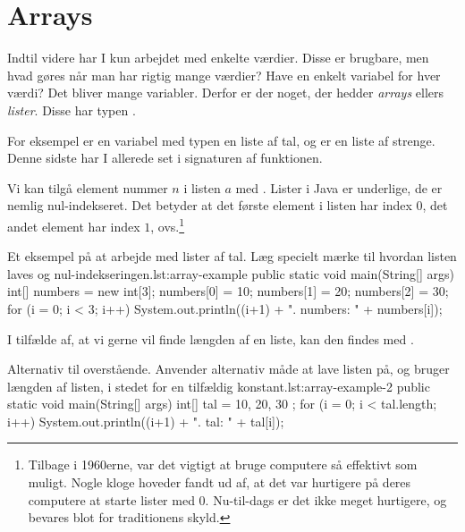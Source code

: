 \section{Arrays}

    Indtil videre har I kun arbejdet med enkelte værdier. Disse er
    brugbare, men hvad gøres når man har rigtig mange værdier? Have
    en enkelt variabel for hver værdi? Det bliver mange variabler.
    Derfor er der noget, der hedder \emph{arrays} ellers \emph{lister}.
    Disse har typen .

    For eksempel er en variabel med typen  en liste
    af tal, og  er en liste af strenge. Denne
    sidste har I allerede set i signaturen af 
    funktionen.

    Vi kan tilgå element nummer \(n\) i listen \(a\) med
    .  Lister i Java er underlige, de er nemlig
    nul-indekseret. Det betyder at det første element i listen har
    index \(0\), det andet element har index \(1\),
    ovs.\footnote{Tilbage i 1960erne, var det vigtigt at bruge
    computere så effektivt som muligt. Nogle kloge hoveder
    fandt ud af, at det var hurtigere på deres computere at starte
    lister med 0. Nu-til-dags er det ikke meget hurtigere, og
    bevares blot for traditionens skyld.}

    \begin{JavaCode}{Et eksempel på at arbejde med lister af tal. Læg specielt mærke til hvordan listen laves og nul-indekseringen.}{lst:array-example}
        public static void main(String[] args) {
            int[] numbers = new int[3];
            numbers[0] = 10;
            numbers[1] = 20;
            numbers[2] = 30;
            for (i = 0; i < 3; i++) {
                System.out.println((i+1) + ". numbers: "
                                         + numbers[i]);
            }
        }
    \end{JavaCode}

    I tilfælde af, at vi gerne vil finde længden af en liste, kan den findes med
    .

    \begin{JavaCode}{Alternativ til overstående. Anvender alternativ måde at lave listen på, og bruger længden af listen, i stedet for en tilfældig konstant.}{lst:array-example-2}
        public static void main(String[] args) {
            int[] tal = { 10, 20, 30 };
            for (i = 0; i < tal.length; i++) {
                System.out.println((i+1) + ". tal: "
                                         + tal[i]);
            }
        }
    \end{JavaCode}

